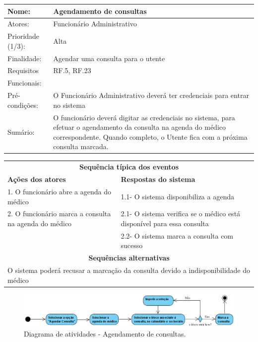 \documentclass[11pt,a4paper,twoside]{report}
\begin{document}
\begin{center}
	\begin{tabularx}{\textwidth}{|lX|}
		\hline
		\textbf{Nome}: & \textbf{Agendamento de consultas } \\ \hline
		Atores: & Funcionário Administrativo   \\ \hline
		Prioridade (1/3): & Alta \\ \hline
		Finalidade: & Agendar uma consulta para o utente    \\ \hline
		Requisitos & RF.5, RF.23    \\
		Funcionais: & \\
		Pré-condições: & O Funcionário Administrativo deverá ter credenciais para entrar no sistema    \\
		Sumário: & O funcionário deverá digitar as credenciais no sistema, para efetuar o agendamento da consulta na agenda do médico correspondente. Quando completo, o Utente fica com a próxima consulta marcada.  \\
		\hline
	\end{tabularx}
	
	\begin{tabularx}{\textwidth}{|XX|}
		\hline
		\multicolumn{2}{|c|}{\textbf{Sequência típica dos eventos} }\\
		\textbf{Ações dos atores}  & \textbf{Respostas do sistema} \\
		1.      O funcionário abre a agenda do médico     & 1.1-  O sistema disponibiliza a agenda  \\
		2.       O funcionário marca a consulta na agenda do médico     & 2.1-   O sistema verifica se o médico está disponível para essa consulta   \\
		& 2.2- O sistema marca a consulta com sucesso     \\
		\hline
		\multicolumn{2}{|c|}{\textbf{Sequências alternativas } }\\
		\hline
		\multicolumn{2}{|l|}{ O sistema poderá recusar a marcação da consulta devido a indisponibilidade do médico }\\
		\hline
	\end{tabularx}
	
\end{center}

\begin{figure}[H]
	\centering
	\includegraphics[width=0.7\linewidth]{image/Atividades/Agendamento de consultas}
	\caption {Diagrama de atividades - Agendamento de consultas.}
	\label{fig:agendamentoconsultas}
\end{figure}
\end{document}
